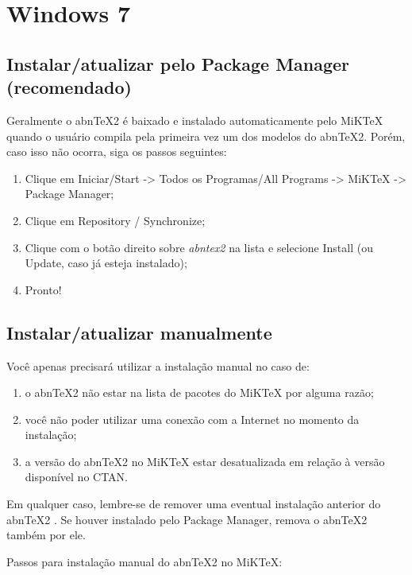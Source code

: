  \section{Windows 7}

\subsection{Instalar/atualizar pelo Package Manager (recomendado)}

Geralmente o abnTeX2 é baixado e instalado automaticamente pelo MiKTeX quando o usuário compila pela primeira vez um dos modelos do abnTeX2. Porém, caso isso não ocorra, siga os passos seguintes:

\begin{enumerate}
\item Clique em Iniciar/Start -> Todos os Programas/All Programs -> MiKTeX -> Package Manager;
\item Clique em Repository / Synchronize;
\item Clique com o botão direito sobre \emph{abntex2} na lista e selecione Install (ou Update, caso já esteja instalado);
\item Pronto!
\end{enumerate}

\subsection{Instalar/atualizar manualmente}

Você apenas precisará utilizar a instalação manual no caso de:

\begin{enumerate}
\item o abnTeX2 não estar na lista de pacotes do MiKTeX por alguma razão;
\item você não poder utilizar uma conexão com a Internet no momento da instalação;
\item a versão do abnTeX2 no MiKTeX estar desatualizada em relação à versão disponível no CTAN.
\end{enumerate}
Em qualquer caso, lembre-se de remover uma eventual instalação anterior do abnTeX2 . Se houver instalado pelo Package Manager, remova o abnTeX2 também por ele.

Passos para instalação manual do abnTeX2 no MiKTeX:

